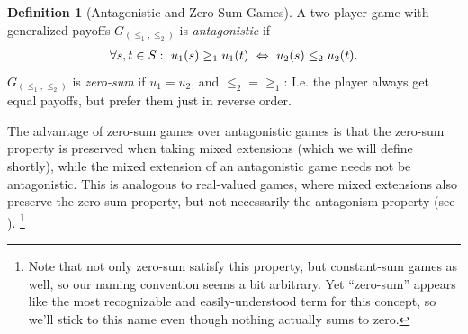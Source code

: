 \documentclass[a4paper,DIV=11]{scrreprt}
\theoremstyle{definition}
\newtheorem{defn}[thm]{Definition} %
\begin{document}
    \begin{defn}[Antagonistic and Zero-Sum Games]
        A two-player game with generalized payoffs $G_{(\leq_1, \leq_2)}$ is \emph{antagonistic} if
        \begin{gather*}
            \forall s, t \in S:~ u_1(s) \geq_1 u_1(t) ~\Leftrightarrow~ u_2(s) \leq_2 u_2(t).
        \end{gather*}
        $G_{(\leq_1, \leq_2)}$ is \emph{zero-sum} if $u_1 = u_2$, and $\leq_2 {=} \geq_1$: I.e. the player always get equal payoffs, but prefer them just in reverse order.
        \label{def:zeroSumGeneralizedPayoffs}
    \end{defn}
    
    The advantage of zero-sum games over antagonistic games is that the zero-sum property is preserved when taking mixed extensions (which we will define shortly), while the mixed extension of an antagonistic game needs not be antagonistic. 
    This is analogous to real-valued games, where mixed extensions also preserve the zero-sum property, but not necessarily the antagonism property (see \cite{bib:andersonAntagonisticGames}).
    \footnote{Note that not only zero-sum satisfy this property, but constant-sum games as well, so our naming convention seems a bit arbitrary.
        Yet “zero-sum” appears like the most recognizable and easily-understood term for this concept, so we'll stick to this name even though nothing actually sums to zero.}
    
\end{document}
